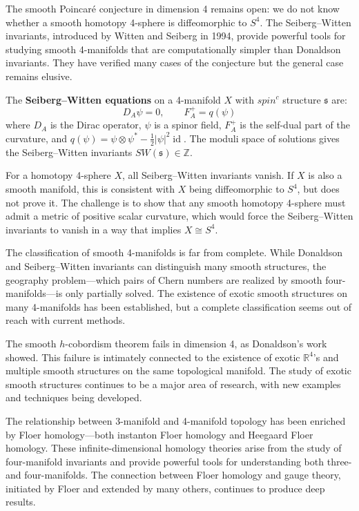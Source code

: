 The smooth Poincar\'e conjecture in dimension 4 remains open: we do not know whether a smooth homotopy 4-sphere is diffeomorphic to $S^4$. The Seiberg--Witten invariants, introduced by Witten and Seiberg in 1994, provide powerful tools for studying smooth 4-manifolds that are computationally simpler than Donaldson invariants. They have verified many cases of the conjecture but the general case remains elusive.

The \textbf{Seiberg--Witten equations} on a 4-manifold $X$ with $spin^c$ structure $\mathfrak{s}$ are:
\[
D_A \psi = 0, \qquad F_A^+ = q(\psi)
\]
where $D_A$ is the Dirac operator, $\psi$ is a spinor field, $F_A^+$ is the self-dual part of the curvature, and $q(\psi) = \psi \otimes \psi^* - \frac{1}{2}|\psi|^2 \operatorname{id}$. The moduli space of solutions gives the Seiberg--Witten invariants $SW(\mathfrak{s}) \in \mathbb{Z}$.

For a homotopy 4-sphere $X$, all Seiberg--Witten invariants vanish. If $X$ is also a smooth manifold, this is consistent with $X$ being diffeomorphic to $S^4$, but does not prove it. The challenge is to show that any smooth homotopy 4-sphere must admit a metric of positive scalar curvature, which would force the Seiberg--Witten invariants to vanish in a way that implies $X \cong S^4$.

The classification of smooth 4-manifolds is far from complete. While Donaldson and Seiberg--Witten invariants can distinguish many smooth structures, the geography problem---which pairs of Chern numbers are realized by smooth four-manifolds---is only partially solved. The existence of exotic smooth structures on many 4-manifolds has been established, but a complete classification seems out of reach with current methods.

The smooth $h$-cobordism theorem fails in dimension 4, as Donaldson's work showed. This failure is intimately connected to the existence of exotic $\mathbb{R}^4$'s and multiple smooth structures on the same topological manifold. The study of exotic smooth structures continues to be a major area of research, with new examples and techniques being developed.

The relationship between 3-manifold and 4-manifold topology has been enriched by Floer homology---both instanton Floer homology and Heegaard Floer homology. These infinite-dimensional homology theories arise from the study of four-manifold invariants and provide powerful tools for understanding both three- and four-manifolds. The connection between Floer homology and gauge theory, initiated by Floer and extended by many others, continues to produce deep results.

